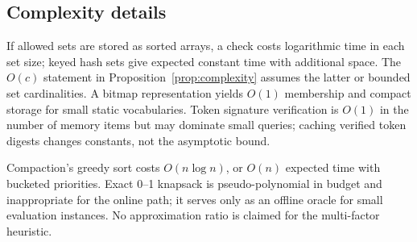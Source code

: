 \subsection{Complexity details}

If allowed sets are stored as sorted arrays, a check costs logarithmic time in each set size; keyed hash sets give expected constant time with additional space. The $O(c)$ statement in Proposition~\ref{prop:complexity} assumes the latter or bounded set cardinalities. A bitmap representation yields $O(1)$ membership and compact storage for small static vocabularies. Token signature verification is $O(1)$ in the number of memory items but may dominate small queries; caching verified token digests changes constants, not the asymptotic bound.

Compaction's greedy sort costs $O(n\log n)$, or $O(n)$ expected time with bucketed priorities. Exact 0--1 knapsack is pseudo-polynomial in budget and inappropriate for the online path; it serves only as an offline oracle for small evaluation instances. No approximation ratio is claimed for the multi-factor heuristic.
